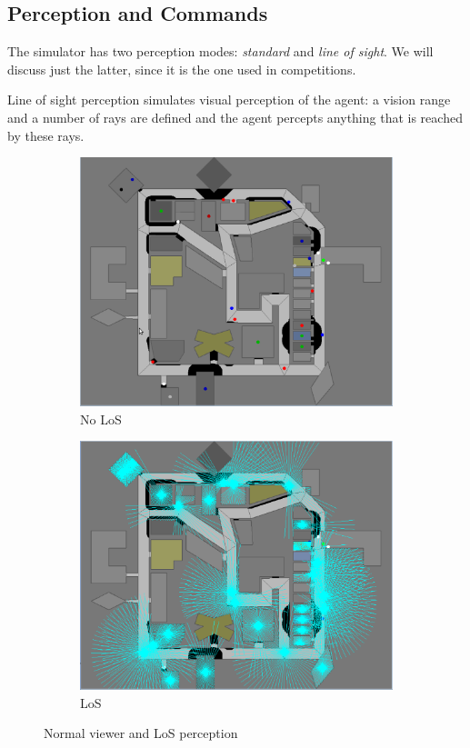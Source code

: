 \documentclass{article}
\begin{document}
\subsection{Perception and Commands}
The simulator has two perception modes: \emph{standard} and \emph{line of sight}. We will discuss just the latter, since it is the one used in competitions.

Line of sight perception simulates visual perception of the agent: a vision range and a number of rays are defined and the agent percepts anything that is reached by these rays.
\begin{figure}[htp]
  \centering
  \begin{subfigure}[hb]{0.45\textwidth}
    \centering
    \includegraphics[width=\textwidth]{figs/no_los.eps}
    \caption{No LoS}
    \label{fig:los_a}
  \end{subfigure}
  \begin{subfigure}[hb]{0.45\textwidth}
    \centering
    \includegraphics[width=\textwidth]{figs/with_los.eps}
    \caption{LoS}
    \label{fig:los_b}
  \end{subfigure}
  \caption{Normal viewer and LoS perception}
  \label{fig:los}
\end{figure}
\end{document}
